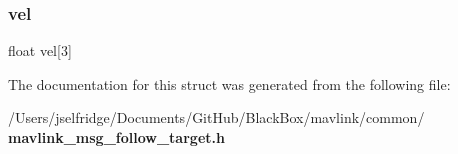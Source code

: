 \mbox{\label{struct____mavlink__follow__target__t_a8a7151d6b02099838884981228d060ef}} 
\subsubsection{vel}
{\footnotesize\ttfamily float vel[3]}



The documentation for this struct was generated from the following file\+:\begin{DoxyCompactItemize}
\item 
/\+Users/jselfridge/\+Documents/\+Git\+Hub/\+Black\+Box/mavlink/common/\textbf{ mavlink\+\_\+msg\+\_\+follow\+\_\+target.\+h}\end{DoxyCompactItemize}
